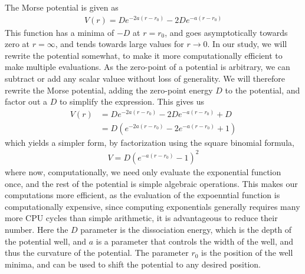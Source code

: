 \documentclass{subfiles}
\begin{document}
The Morse potential is given as
\begin{align*}
    V(r) = De^{-2a(r-r_0)} - 2De^{-a(r-r_0)}
\end{align*}
This function has a minima of $-D$ at $r = r_0$, and goes asymptotically towards zero at $r=\infty$, and tends towards large values for $r\rightarrow0$. In our study, we will rewrite the potential somewhat, to make it more computationally efficient to make multiple evaluations. As the zero-point of a potential is arbitrary, we can subtract or add any scalar valuee without loss of generality. We will therefore rewrite the Morse potential, adding the zero-point energy $D$ to the potential, and factor out a $D$ to simplify the expression. This gives us
\begin{align*}
    V(r) &= De^{-2a(r-r_0)} - 2De^{-a(r-r_0)} + D \\
    &= D(e^{-2a(r-r_0)} - 2e^{-a(r-r_0)} + 1)
\end{align*}
which yields a simpler form, by factorization using the square binomial formula,
\begin{align}
    V = D(e^{-a(r-r_0)} - 1)^2\label{eq:morse_potential}
\end{align}
where now, computationally, we need only evaluate the exponential function once, and the rest of the potential is simple algebraic operations. This makes our computations more efficient, as the evaluation of the expoenntial function is computationally expensive, since computing exponentials generally requires many more CPU cycles than simple arithmetic, it is advantageous to reduce their number. Here the $D$ parameter is the dissociation energy, which is the depth of the potential well, and $a$ is a parameter that controls the width of the well, and thus the curvature of the potential. The parameter $r_0$ is the position of the well minima, and can be used to shift the potential to any desired position.\\
\end{document}
